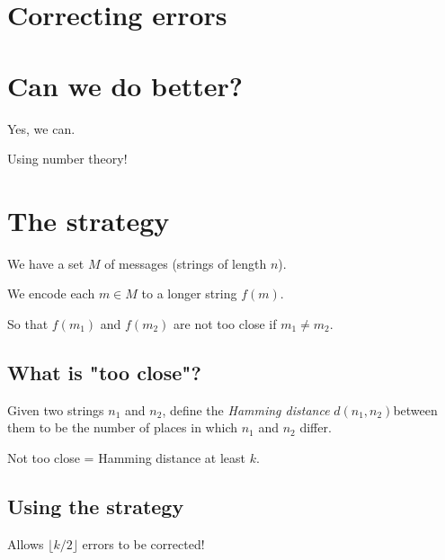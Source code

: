 \documentclass[11pt]{article}
\begin{document}
\href{monkeywords.svg}{}

\begin{center}

\end{center}

\section*{Correcting errors}
\label{sec:orgc9b7313}
\begin{center}

\end{center}

\section*{Can we do better?}
\label{sec:orgea2f297}
Yes, we can.

Using number theory!

\section*{The strategy}
\label{sec:org0b12d55}
We have a set \(M\) of messages (strings of length \(n\)).

We encode each \(m \in M\) to a longer string \(f(m)\).

So that \(f(m_1)\) and \(f(m_2)\) are not too close if \(m_1 \neq m_2\).

\subsection*{What is "too close"?}
\label{sec:org290d20e}
Given two strings \(n_1\) and \(n_2\), define the \emph{Hamming distance} \(d(n_1,n_2)\)between them to be the number of places in which \(n_1\) and \(n_2\) differ.

Not too close = Hamming distance at least \(k\).

\subsection*{Using the strategy}
\label{sec:org0fe615c}
\begin{center}

\end{center}

Allows \(\lfloor k/2 \rfloor\) errors to be corrected!
\end{document}
